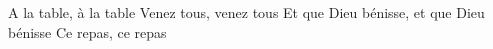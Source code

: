 \beginverse*
A la table, à la table
Venez tous, venez tous
Et que Dieu bénisse, et que Dieu bénisse
Ce repas, ce repas
\endverse
\endsong
